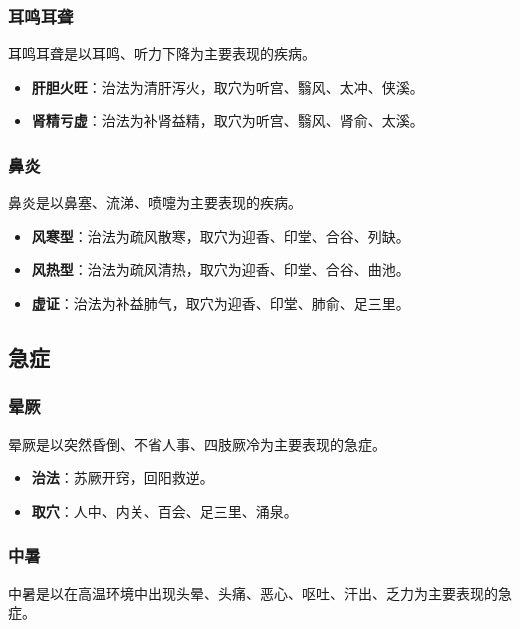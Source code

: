 \documentclass[12pt,UTF8]{ctexbook}
\begin{document}
\subsubsection{耳鸣耳聋}

耳鸣耳聋是以耳鸣、听力下降为主要表现的疾病。

\begin{itemize}
\item \textbf{肝胆火旺}：治法为清肝泻火，取穴为听宫、翳风、太冲、侠溪。
\item \textbf{肾精亏虚}：治法为补肾益精，取穴为听宫、翳风、肾俞、太溪。
\end{itemize}

\subsubsection{鼻炎}

鼻炎是以鼻塞、流涕、喷嚏为主要表现的疾病。

\begin{itemize}
\item \textbf{风寒型}：治法为疏风散寒，取穴为迎香、印堂、合谷、列缺。
\item \textbf{风热型}：治法为疏风清热，取穴为迎香、印堂、合谷、曲池。
\item \textbf{虚证}：治法为补益肺气，取穴为迎香、印堂、肺俞、足三里。
\end{itemize}

\subsection{急症}

\subsubsection{晕厥}

晕厥是以突然昏倒、不省人事、四肢厥冷为主要表现的急症。

\begin{itemize}
\item \textbf{治法}：苏厥开窍，回阳救逆。
\item \textbf{取穴}：人中、内关、百会、足三里、涌泉。
\end{itemize}

\subsubsection{中暑}

中暑是以在高温环境中出现头晕、头痛、恶心、呕吐、汗出、乏力为主要表现的急症。
\end{document}
